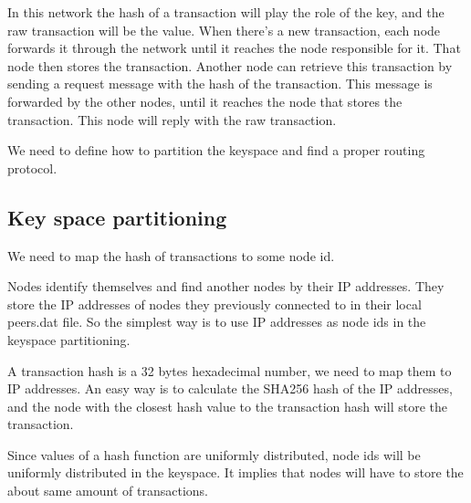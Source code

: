 \documentclass[a4paper,12pt]{article}
\begin{document}
In this network the hash of a transaction will play the role of the key, and the raw transaction will be the value. When there's a new transaction, each node forwards it through the network until it reaches the node responsible for it. That node then stores the transaction. Another node can retrieve this transaction by sending a request message with the hash of the transaction. This message is forwarded by the other nodes, until it reaches the node that stores the transaction. This node will reply with the raw transaction.


We need to define how to partition the keyspace and find a proper routing protocol.


\subsection{Key space partitioning}

We need to map the hash of transactions to some node id.

Nodes identify themselves and find another nodes by their IP addresses. They store the IP addresses of nodes they previously connected to in their local peers.dat file. So the simplest way is to use IP addresses as node ids in the keyspace partitioning.

A transaction hash is a 32 bytes hexadecimal number, we need to map them to IP addresses. An easy way is to calculate the SHA256 hash of the IP addresses, and the node with the closest hash value to the transaction hash will store the transaction.

Since values of a hash function are uniformly distributed, node ids will be uniformly distributed in the keyspace. It implies that nodes will have to store the about same amount of transactions.

\end{document}
